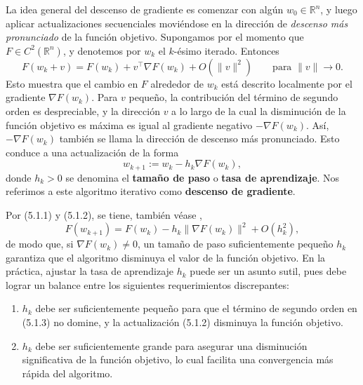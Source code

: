 \documentclass[11pt]{report}
\theoremstyle{definition}
\theoremstyle{plain}
\numberwithin{equation}{section}
\begin{document}
La idea general del descenso de gradiente es comenzar con algún \(w_0\in\mathbb{R}^n\), y luego aplicar actualizaciones secuenciales moviéndose en la dirección de \textit{descenso más pronunciado} de la función objetivo. Supongamos por el momento que \(F\in C^2(\mathbb{R}^n)\), y denotemos por \(w_k\) el \(k\)-ésimo iterado. Entonces
\begin{equation*}
    F(w_k+v)
    =
    F(w_k)+v^\top \nabla F(w_k)+O(\|v\|^2)
    \qquad
    \text{para } \|v\|\to 0.
    \tag{5.1.1}
\end{equation*}
Esto muestra que el cambio en \(F\) alrededor de \(w_k\) está descrito localmente por el gradiente \(\nabla F(w_k)\). Para \(v\) pequeño, la contribución del término de segundo orden es despreciable, y la dirección \(v\) a lo largo de la cual la disminución de la función objetivo es máxima es igual al gradiente negativo \(-\nabla F(w_k)\). Así, \(-\nabla F(w_k)\) también se llama la dirección de descenso más pronunciado. Esto conduce a una actualización de la forma
\begin{equation*}
    w_{k+1}:=w_k-h_k\nabla F(w_k),
    \tag{5.1.2}
\end{equation*}
donde \(h_k>0\) se denomina el \textbf{tamaño de paso} o \textbf{tasa de aprendizaje}. Nos referimos a este algoritmo iterativo como \textbf{descenso de gradiente}.

Por (5.1.1) y (5.1.2), se tiene, también véase \cite[Sección 1.2]{boyd-vandenberghe-2004},
\begin{equation*}
    F(w_{k+1})
    =
    F(w_k)-h_k\|\nabla F(w_k)\|^2+O(h_k^2),
    \tag{5.1.3}
\end{equation*}
de modo que, si \(\nabla F(w_k)\neq 0\), un tamaño de paso suficientemente pequeño \(h_k\) garantiza que el algoritmo disminuya el valor de la función objetivo. En la práctica, ajustar la tasa de aprendizaje \(h_k\) puede ser un asunto sutil, pues debe lograr un balance entre los siguientes requerimientos discrepantes:

\begin{enumerate}
    \item[(i)] \(h_k\) debe ser suficientemente pequeño para que el término de segundo orden en (5.1.3) no domine, y la actualización (5.1.2) disminuya la función objetivo.

    \item[(ii)] \(h_k\) debe ser suficientemente grande para asegurar una disminución significativa de la función objetivo, lo cual facilita una convergencia más rápida del algoritmo.
\end{enumerate}
\end{document}
